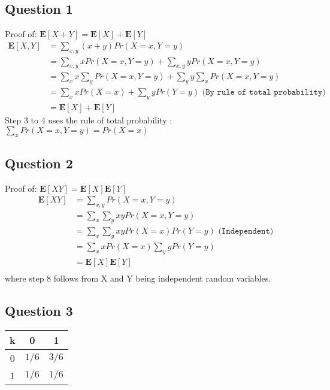 \documentclass{article}
\begin{document}
\subsection{Question 1}
Proof of: $ \mathbf{E}[X+Y]= \mathbf{E}[X] + \mathbf{E}[Y]$
\begin{align}
\mathbf{E}[X,Y] &= \sum\limits_{x,y}(x+y)Pr(X=x,Y=y) \\
&= \sum\limits_{x,y} x Pr(X=x,Y=y) + \sum\limits_{x,y} y Pr(X=x,Y=y) \\
&= \sum\limits_{x} x \sum\limits_{y} Pr(X=x,Y=y) + \sum\limits_{y} y \sum\limits_{x}  Pr(X=x,Y=y) \\
&= \sum\limits_{x} x Pr(X=x) + \sum\limits_{y} y Pr(Y=y) \texttt{   (By rule of total probability)}\\
&= \mathbf{E}[X] + \mathbf{E}[Y]
\end{align}
Step 3 to 4 uses the rule of total probability : $ \sum\limits_{x} Pr(X=x,Y=y) = Pr(X=x) $
\subsection{Question 2}
Proof of: $ \mathbf{E}[XY]= \mathbf{E}[X] \mathbf{E}[Y]$
\begin{align}
\mathbf{E}[XY] &= \sum\limits_{x,y} Pr(X=x,Y=y) \\
&= \sum\limits_{x}\sum\limits_{y} xy Pr(X=x,Y=y) \\
&= \sum\limits_{x}\sum\limits_{y} xy Pr(X=x)Pr(Y=y) \texttt{  (Independent)} \\
&= \sum\limits_{x}x Pr(X=x)\sum\limits_{y} y Pr (Y=y) \\
&= \mathbf{E}[X] \mathbf{E}[Y] \\
\end{align}
where step 8 follows from X and Y being independent random variables.
\subsection{Question 3}

\begin{table}[H]
  \centering
  \label{tab:table1}
  \begin{tabular}{c||c|c}
    \textsf{k} & 0 & 1 \\
    \hline
    0 & $1/6$ & $3/6$ \\
    1 & $1/6$ & $1/6$\\
  \end{tabular}
\end{table}
\end{document}
